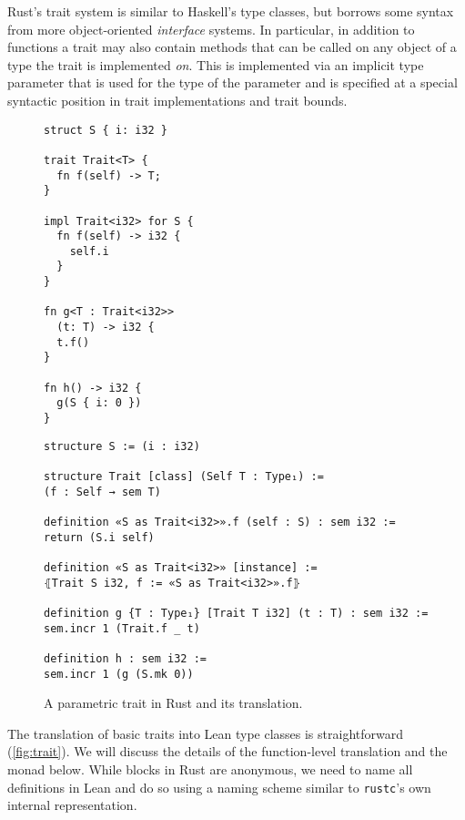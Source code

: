 Rust's trait system is similar to Haskell's type classes, but borrows some
syntax from more object-oriented \emph{interface} systems. In particular, in addition
to functions a trait may also contain methods that can be called on any object
of a type the trait is implemented \emph{on}. This is implemented via an implicit
type parameter  that is used for the type of the 
parameter and is specified at a special syntactic position in trait
implementations and trait bounds.

\begin{figure}[bt]
\begin{minipage}{0.36\textwidth}
  \begin{verbatim}
struct S { i: i32 }

trait Trait<T> {
  fn f(self) -> T;
}

impl Trait<i32> for S {
  fn f(self) -> i32 {
    self.i
  }
}

fn g<T : Trait<i32>>
  (t: T) -> i32 {
  t.f()
}

fn h() -> i32 {
  g(S { i: 0 })
}
  \end{verbatim}
\end{minipage}
\begin{minipage}{0.64\textwidth}
  \begin{verbatim}
structure S := (i : i32)

structure Trait [class] (Self T : Type₁) :=
(f : Self → sem T)

definition «S as Trait<i32>».f (self : S) : sem i32 :=
return (S.i self)

definition «S as Trait<i32>» [instance] :=
⦃Trait S i32, f := «S as Trait<i32>».f⦄

definition g {T : Type₁} [Trait T i32] (t : T) : sem i32 :=
sem.incr 1 (Trait.f _ t)

definition h : sem i32 :=
sem.incr 1 (g (S.mk 0))
  \end{verbatim}
\end{minipage}\vspace{1em}

\caption{A parametric trait in Rust and its translation.}
\label{fig:trait}
\end{figure}

The translation of basic traits into Lean type classes is straightforward
(\autoref{fig:trait}). We will discuss the details of the function-level translation and the 
monad below. While  blocks in Rust are anonymous, we need to name all
definitions in Lean and do so using a naming scheme similar to \texttt{rustc}'s
own internal representation.

